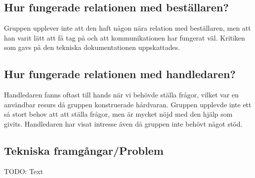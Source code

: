 \documentclass{article}
\begin{document}
\subsection{Hur fungerade relationen med beställaren?}
Gruppen upplever inte att den haft någon nära relation med beställaren, men att han varit lätt att få tag på och att kommunikationen har fungerat väl. Kritiken som gavs på den tekniska dokumentationen uppskattades. 

\subsection{Hur fungerade relationen med handledaren?}
Handledaren fanns oftast till hands när vi behövde ställa frågor, vilket var en användbar resurs då gruppen konstruerade hårdvaran. Gruppen upplevde inte ett så stort behov att att ställa frågor, men är mycket nöjd med den hjälp som givits. Handledaren har visat intresse även då gruppen inte behövt något stöd.

\subsection{Tekniska framgångar/Problem}
TODO: Text
\end{document}
